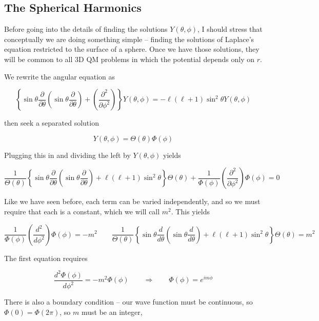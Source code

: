 \subsection{The Spherical Harmonics} 

Before going into the details of finding the solutions $Y(\theta, \phi)$,
I should stress that conceptually we are doing something simple -- finding the
solutions of Laplace's equation restricted to the surface of a sphere. Once we
have those solutions, they will be common to all 3D QM problems in which the
potential depends only on $r$. 

We rewrite the angular equation as 

\[
\left\{ \sin\theta \frac{\partial }{\partial \theta}  \left( \sin\theta
  \frac{\partial }{\partial \theta}  \right) + \left( \frac{\partial^2
}{\partial \phi^2}  \right) \right\} Y(\theta, \phi) = -\ell(\ell+1) \sin^2
\theta Y(\theta, \phi)  
\] \vspace{3px}

then seek a separated solution 

\[
Y(\theta, \phi) = \Theta(\theta) \Phi(\phi)
\] \vspace{3px}

Plugging this in and dividing the left by $Y(\theta, \phi)$ yields 

\[
\frac{1}{\Theta(\theta)} \left\{ \sin \theta \frac{\partial }{\partial \theta}
  \left( \sin\theta \frac{\partial }{\partial \theta}  \right) + \ell(\ell+1)
\sin^2 \theta \right\} \Theta(\theta) + \frac{1}{\Phi(\phi)}\left(
\frac{\partial^2 }{\partial \phi^2}  \right) \Phi(\phi) = 0  
\] \vspace{3px}

Like we have seen before, each term can be varied independently, and so we must
require that each is a constant, which we will call $m^2$. This yields 

\[
\frac{1}{\Phi(\phi)} \left( \frac{d^2 }{d \phi^2}  \right)  \Phi(\phi) = -m^2
\qquad \frac{1}{\Theta(\theta)} \left\{ \sin\theta \frac{d }{d \theta} \left(
\sin\theta \frac{d }{d \theta}  \right) + \ell(\ell+1) \sin^2 \theta \right\}
\Theta(\theta) = m^2 
\] \vspace{3px}

The first equation requires 

\[
\frac{d^2 \Phi(\phi)}{d \phi^2} = -m^2 \Phi(\phi) \qquad \Rightarrow \qquad
\Phi(\phi) = e^{im\phi}
\] \vspace{3px}


There is also a boundary condition -- our wave function must be continuous, so
$\Phi(0) = \Phi(2\pi)$, so $m$ must be an integer, 

